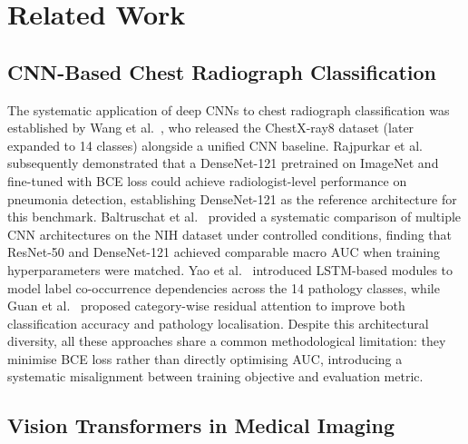 \documentclass[conference]{IEEEtran}
\begin{document}
\section{Related Work}

\subsection{CNN-Based Chest Radiograph Classification}

The systematic application of deep CNNs to chest radiograph
classification was established by Wang et al.~\cite{wang2017}, who
released the ChestX-ray8 dataset (later expanded to 14 classes)
alongside a unified CNN baseline. Rajpurkar et al.~\cite{rajpurkar2017}
subsequently demonstrated that a DenseNet-121 pretrained on ImageNet
and fine-tuned with BCE loss could achieve radiologist-level performance
on pneumonia detection, establishing DenseNet-121 as the reference
architecture for this benchmark. Baltruschat et al.~\cite{baltruschat2019}
provided a systematic comparison of multiple CNN architectures on the
NIH dataset under controlled conditions, finding that ResNet-50 and
DenseNet-121 achieved comparable macro AUC when training hyperparameters
were matched. Yao et al.~\cite{yao2018} introduced LSTM-based modules
to model label co-occurrence dependencies across the 14 pathology
classes, while Guan et al.~\cite{guan2020} proposed category-wise
residual attention to improve both classification accuracy and
pathology localisation. Despite this architectural diversity, all
these approaches share a common methodological limitation: they minimise
BCE loss rather than directly optimising AUC, introducing a systematic
misalignment between training objective and evaluation metric.

\subsection{Vision Transformers in Medical Imaging}
\end{document}

